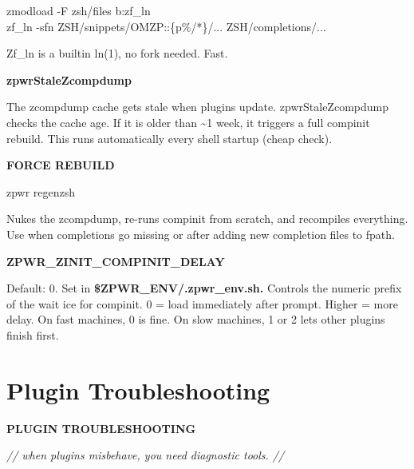 \documentclass[11pt,a4paper,twoside]{book}
\begin{document}
\begin{codebox}
\color{neongreen}zmodload -F zsh/files b:zf\_ln\\
\color{neongreen}zf\_ln -sfn ZSH/snippets/OMZP::\{p\%/*\}/... ZSH/completions/...\\
\end{codebox}

Zf\_ln is a builtin ln(1), no fork needed. Fast.


\vspace{12pt}
{\bfseries\color{neonyellow} zpwrStaleZcompdump}\vspace{4pt}

The zcompdump cache gets stale when plugins update. zpwrStaleZcompdump checks the cache age. If it is older than \textasciitilde{}1 week, it triggers a full compinit rebuild. This runs automatically every shell startup (cheap check).


\vspace{12pt}
{\bfseries\color{neonyellow} FORCE REBUILD}\vspace{4pt}

\begin{codebox}
\color{neongreen}zpwr regenzsh\\
\end{codebox}

Nukes the zcompdump, re-runs compinit from scratch, and recompiles everything. Use when completions go missing or after adding new completion files to fpath.


\vspace{12pt}
{\bfseries\color{neonyellow} \textbf{ZPWR\_ZINIT}\_COMPINIT\_DELAY}\vspace{4pt}

Default: 0. Set in \textbf{\$ZPWR\_ENV/.zpwr\_env.sh.} Controls the numeric prefix of the wait ice for compinit. 0 = load immediately after prompt. Higher = more delay. On fast machines, 0 is fine. On slow machines, 1 or 2 lets other plugins finish first.


\vspace{16pt}

\section{Plugin Troubleshooting}


\vspace{10pt}
{\large\bfseries\color{neoncyan} PLUGIN TROUBLESHOOTING}\vspace{6pt}

{\small\itshape\color{dimtext} // when plugins misbehave, you need diagnostic tools. //}
\end{document}
